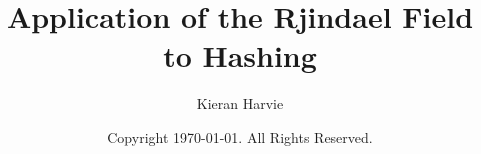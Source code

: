 \documentclass[12pt]{report}
\title{Application of the Rjindael Field to Hashing}
\date{Copyright \textcopyright  \today. All Rights Reserved.}
\author{Kieran Harvie}
\begin{document}
\maketitle
\tableofcontents





\renewcommand{\thechapter}{A}

\end{document}
